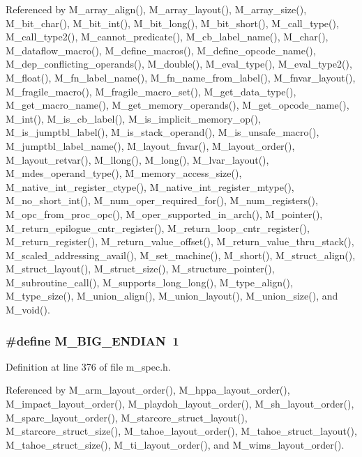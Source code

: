 Referenced by M\_\-array\_\-align(), M\_\-array\_\-layout(), M\_\-array\_\-size(), M\_\-bit\_\-char(), M\_\-bit\_\-int(), M\_\-bit\_\-long(), M\_\-bit\_\-short(), M\_\-call\_\-type(), M\_\-call\_\-type2(), M\_\-cannot\_\-predicate(), M\_\-cb\_\-label\_\-name(), M\_\-char(), M\_\-dataflow\_\-macro(), M\_\-define\_\-macros(), M\_\-define\_\-opcode\_\-name(), M\_\-dep\_\-conflicting\_\-operands(), M\_\-double(), M\_\-eval\_\-type(), M\_\-eval\_\-type2(), M\_\-float(), M\_\-fn\_\-label\_\-name(), M\_\-fn\_\-name\_\-from\_\-label(), M\_\-fnvar\_\-layout(), M\_\-fragile\_\-macro(), M\_\-fragile\_\-macro\_\-set(), M\_\-get\_\-data\_\-type(), M\_\-get\_\-macro\_\-name(), M\_\-get\_\-memory\_\-operands(), M\_\-get\_\-opcode\_\-name(), M\_\-int(), M\_\-is\_\-cb\_\-label(), M\_\-is\_\-implicit\_\-memory\_\-op(), M\_\-is\_\-jumptbl\_\-label(), M\_\-is\_\-stack\_\-operand(), M\_\-is\_\-unsafe\_\-macro(), M\_\-jumptbl\_\-label\_\-name(), M\_\-layout\_\-fnvar(), M\_\-layout\_\-order(), M\_\-layout\_\-retvar(), M\_\-llong(), M\_\-long(), M\_\-lvar\_\-layout(), M\_\-mdes\_\-operand\_\-type(), M\_\-memory\_\-access\_\-size(), M\_\-native\_\-int\_\-register\_\-ctype(), M\_\-native\_\-int\_\-register\_\-mtype(), M\_\-no\_\-short\_\-int(), M\_\-num\_\-oper\_\-required\_\-for(), M\_\-num\_\-registers(), M\_\-opc\_\-from\_\-proc\_\-opc(), M\_\-oper\_\-supported\_\-in\_\-arch(), M\_\-pointer(), M\_\-return\_\-epilogue\_\-cntr\_\-register(), M\_\-return\_\-loop\_\-cntr\_\-register(), M\_\-return\_\-register(), M\_\-return\_\-value\_\-offset(), M\_\-return\_\-value\_\-thru\_\-stack(), M\_\-scaled\_\-addressing\_\-avail(), M\_\-set\_\-machine(), M\_\-short(), M\_\-struct\_\-align(), M\_\-struct\_\-layout(), M\_\-struct\_\-size(), M\_\-structure\_\-pointer(), M\_\-subroutine\_\-call(), M\_\-supports\_\-long\_\-long(), M\_\-type\_\-align(), M\_\-type\_\-size(), M\_\-union\_\-align(), M\_\-union\_\-layout(), M\_\-union\_\-size(), and M\_\-void().
\subsubsection{\setlength{\rightskip}{0pt plus 5cm}\#define M\_\-BIG\_\-ENDIAN~1}\label{m__spec_8h_5e2e725c6320b018489d503edeb07a68}




Definition at line 376 of file m\_\-spec.h.

Referenced by M\_\-arm\_\-layout\_\-order(), M\_\-hppa\_\-layout\_\-order(), M\_\-impact\_\-layout\_\-order(), M\_\-playdoh\_\-layout\_\-order(), M\_\-sh\_\-layout\_\-order(), M\_\-sparc\_\-layout\_\-order(), M\_\-starcore\_\-struct\_\-layout(), M\_\-starcore\_\-struct\_\-size(), M\_\-tahoe\_\-layout\_\-order(), M\_\-tahoe\_\-struct\_\-layout(), M\_\-tahoe\_\-struct\_\-size(), M\_\-ti\_\-layout\_\-order(), and M\_\-wims\_\-layout\_\-order().
